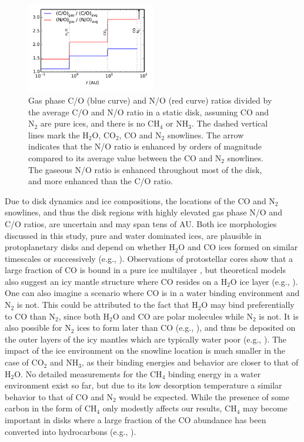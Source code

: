 \documentclass[apj]{emulateapj}
\begin{document}
\begin{figure}[h!]
\centering
\includegraphics[width=0.5\textwidth]{CN_norm.pdf}
\caption{Gas phase C/O (blue curve) and N/O (red curve) ratios divided by the average C/O and N/O ratio in a static disk, assuming CO and N$_2$ are pure ices, and there is no CH$_4$ or NH$_3$. The dashed vertical lines mark the H$_2$O, CO$_2$, CO and N$_2$ snowlines. The arrow indicates that the N/O ratio is enhanced by orders of magnitude compared to its average value between the CO and N$_2$ snowlines. The gaseous N/O ratio is enhanced throughout most of the disk, and more enhanced than the C/O ratio.}  
\label{fig:enhance}
\end{figure}




Due to disk dynamics and ice compositions, the locations of the CO and N$_2$ snowlines, and thus the disk regions with highly elevated gas phase N/O and C/O ratios, are uncertain and may span tens of AU. Both ice morphologies discussed in this study, pure and water dominated ices, are plausible in protoplanetary disks and depend on whether H$_2$O and CO ices formed on similar timescales or successively (e.g., \citealt{garrod11}). Observations of protostellar cores show that a large fraction of CO is bound in a pure ice multilayer \citep{pontoppidan03}, but theoretical models also suggest an icy mantle structure where CO resides on a H$_2$O ice layer (e.g., \citealt{collings03}). One can also imagine a scenario where CO is in a water binding environment and N$_2$ is not. This could be attributed to the fact that H$_2$O may bind preferentially to CO than N$_2$, since both H$_2$O and CO are polar molecules while N$_2$ is not. It is also possible for N$_2$ ices to form later than CO (e.g., \citealt{pagani12}), and thus be deposited on the outer layers of the icy mantles which are typically water poor (e.g., \citealt{garrod11}). The impact of the ice environment on the snowline location is much smaller in the case of CO$_2$ and NH$_3$, as their binding energies and behavior are closer to that of H$_2$O. No detailed measurements for the CH$_4$ binding energy in a water environment exist so far, but due to its low desorption temperature a similar behavior to that of CO and N$_2$ would be expected. While the presence of some carbon in the form of CH$_4$ only modestly affects our results, CH$_4$ may become important in disks where a large fraction of the CO abundance has been converted into hydrocarbons (e.g., \citealt{du15}). 
\end{document}
